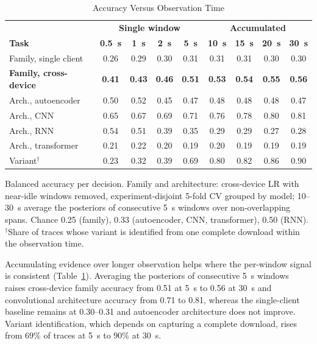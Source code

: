 \begin{table}[!htbp]
\centering
\caption{Accuracy Versus Observation Time}
\label{tab:window_results}
\scriptsize
\renewcommand{\arraystretch}{1.08}
\setlength{\tabcolsep}{2pt}
\begin{tabular}{lcccc|cccc}
\hline
& \multicolumn{4}{c|}{\textbf{Single window}} & \multicolumn{4}{c}{\textbf{Accumulated}} \\
\textbf{Task} & \textbf{0.5~s} & \textbf{1~s} & \textbf{2~s} & \textbf{5~s} & \textbf{10~s} & \textbf{15~s} & \textbf{20~s} & \textbf{30~s} \\
\hline
Family, single client     & 0.26 & 0.29 & 0.30 & 0.31 & 0.31 & 0.31 & 0.30 & 0.30 \\
\textbf{Family, cross-device} & \textbf{0.41} & \textbf{0.43} & \textbf{0.46} & \textbf{0.51} & \textbf{0.53} & \textbf{0.54} & \textbf{0.55} & \textbf{0.56} \\
\hline
Arch., autoencoder         & 0.50 & 0.52 & 0.45 & 0.47 & 0.48 & 0.48 & 0.48 & 0.47 \\
Arch., CNN                 & 0.65 & 0.67 & 0.69 & 0.71 & 0.76 & 0.78 & 0.80 & 0.81 \\
Arch., RNN                 & 0.54 & 0.51 & 0.39 & 0.35 & 0.29 & 0.29 & 0.27 & 0.28 \\
Arch., transformer         & 0.21 & 0.22 & 0.20 & 0.19 & 0.20 & 0.19 & 0.19 & 0.19 \\
\hline
Variant$^{\dagger}$        & 0.23 & 0.32 & 0.39 & 0.69 & 0.80 & 0.82 & 0.86 & 0.90 \\
\hline
\end{tabular}

\vspace{2pt}
\parbox{0.95\columnwidth}{\scriptsize Balanced accuracy per decision. Family and
architecture: cross-device LR with near-idle windows removed, experiment-disjoint
5-fold CV grouped by model; 10--30~s average the posteriors of consecutive 5~s
windows over non-overlapping spans. Chance 0.25 (family), 0.33 (autoencoder,
CNN, transformer), 0.50 (RNN). $^{\dagger}$Share of traces whose variant is
identified from one complete download within the observation time.}
\end{table}

Accumulating evidence over longer observation helps where the per-window signal
is consistent (Table~\ref{tab:window_results}). Averaging the posteriors of
consecutive 5~s windows raises cross-device family accuracy from 0.51 at 5~s to
0.56 at 30~s and convolutional architecture accuracy from 0.71 to 0.81, whereas
the single-client baseline remains at 0.30--0.31 and autoencoder architecture
does not improve. Variant identification, which depends on capturing a complete
download, rises from $69\%$ of traces at 5~s to $90\%$ at 30~s.


